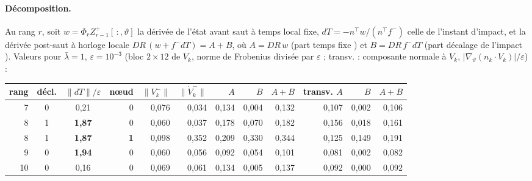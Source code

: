 \documentclass[11pt,a4paper]{article}
\theoremstyle{remark}
\newcommand{\vth}{\vartheta}
\begin{document}
\paragraph{D\'ecomposition.} Au rang $r$, soit $w=\Phi_rZ_{r-1}^+[\,:,\vth]$ la d\'eriv\'ee de l'\'etat avant saut \`a temps local fixe, $dT=-n^\top w/(n^\top f^-)$ celle de l'instant d'impact, et la d\'eriv\'ee post-saut \`a horloge locale $DR\,(w+f^-dT)=A+B$, o\`u $A=DR\,w$ (part \og temps fixe \fg) et $B=DR\,f^-dT$ (part \og d\'ecalage de l'impact \fg). Valeurs pour $\bar\lambda=1$, $\varepsilon=10^{-3}$ (bloc $2\times12$ de $V_k$, norme de Frobenius divis\'ee par $\varepsilon$ ; \og transv. \fg{} : composante normale \`a $V_k$, $\lvert\nabla_\vth(n_k\!\cdot V_k)\rvert/\varepsilon$) :
\begin{center}\small
\begin{tabular}{rcc|rrr|rrr|rrr}
\toprule
rang & d\'ecl. & $\lVert dT\rVert/\varepsilon$ & n\oe ud & $\lVert V_k^-\rVert$ & $\lVert\dot V_k^-\rVert$ & $A$ & $B$ & $A{+}B$ & transv. $A$ & $B$ & $A{+}B$\\
\midrule
7 & 0 & 0,21 & 0 & 0,076 & 0,034 & 0,134 & 0,004 & 0,132 & 0,107 & 0,002 & 0,106\\
8 & 1 & \textbf{1,87} & 0 & 0,060 & 0,037 & 0,178 & 0,070 & 0,182 & 0,156 & 0,018 & 0,161\\
8 & 1 & \textbf{1,87} & \textbf{1} & 0,098 & 0,352 & 0,209 & 0,330 & 0,344 & 0,125 & 0,149 & 0,191\\
9 & 0 & \textbf{1,94} & 0 & 0,060 & 0,056 & 0,092 & 0,054 & 0,101 & 0,081 & 0,002 & 0,082\\
10 & 0 & 0,16 & 0 & 0,069 & 0,061 & 0,134 & 0,005 & 0,137 & 0,092 & 0,000 & 0,092\\
\bottomrule
\end{tabular}
\end{center}
\end{document}
